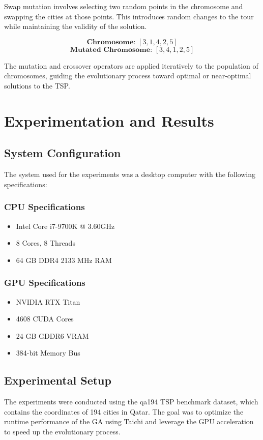 \documentclass[conference]{IEEEtran}
\begin{document}
Swap mutation involves selecting two random points in the chromosome and
swapping the cities at those points. This introduces random changes to the tour
while maintaining the validity of the solution.

\begin{equation*}
    \textbf{Chromosome: } [3, 1, 4, 2, 5]
\end{equation*}
\begin{equation*}
    \textbf{Mutated Chromosome: } [3, 4, 1, 2, 5]
\end{equation*}

The mutation and crossover operators are applied iteratively to the population
of chromosomes, guiding the evolutionary process toward optimal or near-optimal
solutions to the TSP.
\section{Experimentation and Results}
\subsection{System Configuration}
The system used for the experiments was a desktop computer with the following
specifications:

\subsubsection{CPU Specifications}
\begin{itemize}
    \item Intel Core i7-9700K @ 3.60GHz
    \item 8 Cores, 8 Threads
    \item 64 GB DDR4 2133 MHz RAM
\end{itemize}

\subsubsection{GPU Specifications}
\begin{itemize}
    \item NVIDIA RTX Titan
    \item 4608 CUDA Cores
    \item 24 GB GDDR6 VRAM
    \item 384-bit Memory Bus
\end{itemize}

\subsection{Experimental Setup}
The experiments were conducted using the qa194 TSP benchmark dataset, which
contains the coordinates of 194 cities in Qatar. The goal was to optimize the
runtime performance of the GA using Taichi and leverage the GPU acceleration to
speed up the evolutionary process.
\end{document}
